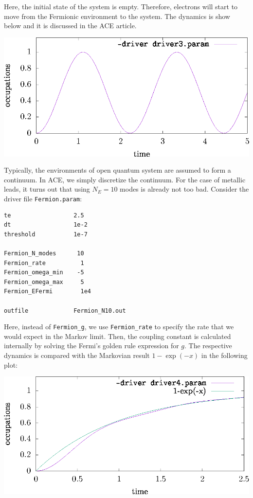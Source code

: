 \documentclass{scrartcl}
\begin{document}
Here, the initial state of the system is empty. Therefore, electrons will 
start to move from the Fermionic environment to the system.
The dynamics is show below and it is discussed in the ACE article.

\includegraphics[width=20cm]{figs/plot_hopping_N2.eps}


Typically, the environments of open quantum system are assumed to form 
a continuum. In ACE, we simply discretize the continuum. For the case 
of metallic leads, it turns out that using $N_E=10$ modes is already
not too bad. 
Consider the driver file \verb+Fermion.param+:

\noindent\makebox[5cm]{\rule{7cm}{0.4pt}}
\begin{verbatim}
te                  2.5
dt                  1e-2
threshold           1e-7

Fermion_N_modes      10
Fermion_rate          1 
Fermion_omega_min    -5
Fermion_omega_max     5
Fermion_EFermi        1e4

outfile             Fermion_N10.out
\end{verbatim}
\noindent\makebox[5cm]{\rule{7cm}{0.4pt}}

Here, instead of \verb+Fermion_g+, we use \verb+Fermion_rate+ to specify the 
rate that we would expect in the Markov limit. Then, the coupling constant  
is calculated internally by solving the Fermi's golden rule expression for $g$.
The respective dynamics is compared with the Markovian result
$1-\exp(-x)$ in the following plot:

\includegraphics[width=20cm]{figs/plot_hopping_N10.eps}
\end{document}

